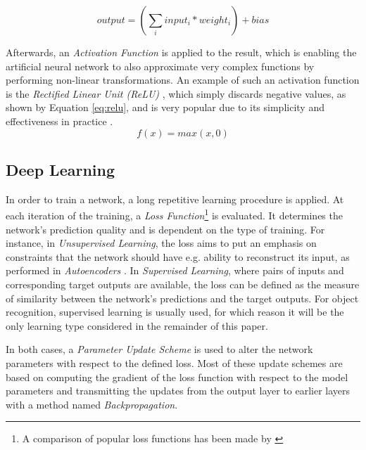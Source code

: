 \documentclass[conference]{IEEEtran}
\begin{document}
\begin{equation}\label{eq:output}
output = (\sum_i{input_i * weight_i}) + bias
\end{equation}

Afterwards, an \emph{Activation Function} is applied to the result, which is enabling the artificial neural network to also approximate very complex functions by performing non-linear transformations. An example of such an activation function is the \emph{Rectified Linear Unit (ReLU)} \cite{ReLU}, which simply discards negative values, as shown by Equation \ref{eq:relu}, and is very popular due to its simplicity and effectiveness in practice \cite{AlexNet}.
\begin{equation}\label{eq:relu}
f(x) = max(x,0)
\end{equation}


\subsection{Deep Learning}\label{subsec:dl}
In order to train a network, a long repetitive learning procedure is applied. At each iteration of the training, a \emph{Loss Function}\footnote{A comparison of popular loss functions has been made by \cite{Loss}} is evaluated. It determines the network's prediction quality and is dependent on the type of training. For instance, in \emph{Unsupervised Learning}, the loss aims to put an emphasis on constraints that the network should have e.g. ability to reconstruct its input, as performed in \emph{Autoencoders} \cite{Autoencoder}. In \emph{Supervised Learning}, where pairs of inputs and corresponding target outputs are available, the loss can be defined as the measure of similarity between the network's predictions and the target outputs. For object recognition, supervised learning is usually used, for which reason it will be the only learning type considered in the remainder of this paper.

In both cases, a \emph{Parameter Update Scheme} is used to alter the network parameters with respect to the defined loss. Most of these update schemes are based on computing the gradient of the loss function with respect to the model parameters and transmitting the updates from the output layer to earlier layers with a method named \emph{Backpropagation}.
\end{document}
